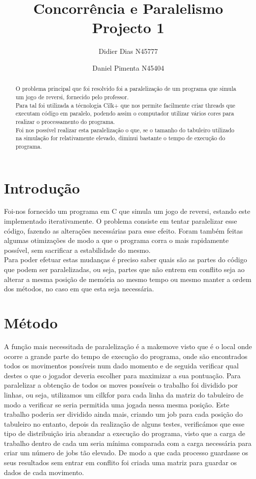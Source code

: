 \documentclass[a4paper]{article}
\title{Concorrência e Paralelismo \\
\large Projecto 1}
\author{Didier Dias N45777\and Daniel Pimenta N45404}
\begin{document}
\maketitle

\begin{abstract}
O problema principal que foi resolvido foi a paralelização de um programa que simula um jogo de reversi, fornecido pelo professor. \\
Para tal foi utilizada a técnologia Cilk+ que nos permite facilmente criar threads que executam código em paralelo, podendo assim o computador utilizar vários cores para realizar o processamento do programa.\\
Foi nos possível realizar esta paralelização o que, se o tamanho do tabuleiro utilizado na simulação for relativamente elevado, diminui bastante o tempo de execução do programa.
\end{abstract}

\section{Introdução}


Foi-nos fornecido um programa em C que simula um jogo de reversi, estando este implementado iterativamente. O problema consiste em tentar paralelizar esse código, fazendo as alterações necessárias para esse efeito. Foram também feitas algumas otimizações de modo a que o programa corra o mais rapidamente possível, sem sacrificar a estabilidade do mesmo.\\
Para poder efetuar estas mudanças é preciso saber quais são as partes do código que podem ser paralelizadas, ou seja, partes que não entrem em conflito seja ao alterar a mesma posição de memória ao mesmo tempo ou mesmo manter a ordem dos métodos, no caso em que esta seja necessária.

\section{Método}
A função mais necessitada de paralelização é a make\textunderscore move visto que é o local onde ocorre a grande parte do tempo de execução do programa, onde são encontrados todos os movimentos possíveis num dado momento e de seguida verificar qual destes o que o jogador deveria escolher para maximizar a sua pontuação. Para paralelizar a obtenção de todos os moves possíveis o trabalho foi dividido por linhas, ou seja, utilizamos um cilk\textunderscore for para cada linha da matriz do tabuleiro de modo a verificar se seria permitida uma jogada nessa mesma posição. Este trabalho poderia ser dividido ainda mais, criando um job para cada posição do tabuleiro no entanto, depois da realização de alguns testes, verificámos que esse tipo de distribuição iria abrandar a execução do programa, visto que a carga de trabalho dentro de cada um seria mínima comparada com a carga necessária para criar um número de jobs tão elevado.
De modo a que cada processo guardasse os seus resultados sem entrar em conflito foi criada uma matriz para guardar os dados de cada movimento.
\end{document}
